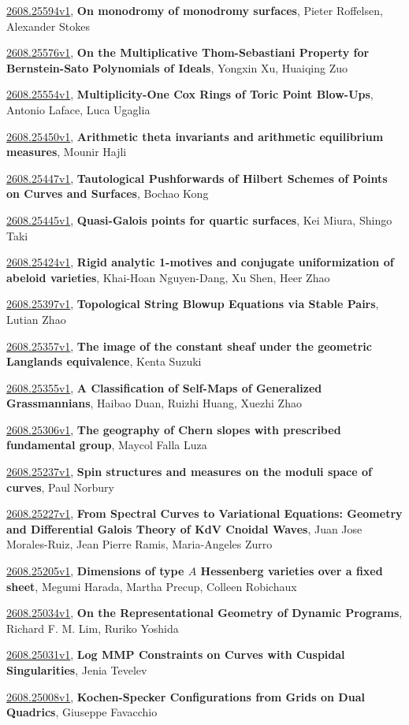 \documentclass[9pt, a4paper]{article}
\theoremstyle{plain}
\theoremstyle{definition}
\theoremstyle{remark}
\newcommand{\arxiv}[3]{\href{https://arxiv.org/abs/#1}{#1}, \textbf{\textcolor{arxivblue}{#2}}, #3}
\begin{document}
\arxiv{2608.25594v1}{On monodromy of monodromy surfaces}{Pieter Roffelsen, Alexander Stokes}

\arxiv{2608.25576v1}{On the Multiplicative Thom-Sebastiani Property for Bernstein-Sato Polynomials of Ideals}{Yongxin Xu, Huaiqing Zuo}

\arxiv{2608.25554v1}{Multiplicity-One Cox Rings of Toric Point Blow-Ups}{Antonio Laface, Luca Ugaglia}

\arxiv{2608.25450v1}{Arithmetic theta invariants and arithmetic equilibrium measures}{Mounir Hajli}

\arxiv{2608.25447v1}{Tautological Pushforwards of Hilbert Schemes of Points on Curves and Surfaces}{Bochao Kong}

\arxiv{2608.25445v1}{Quasi-Galois points for quartic surfaces}{Kei Miura, Shingo Taki}

\arxiv{2608.25424v1}{Rigid analytic 1-motives and conjugate uniformization of abeloid varieties}{Khai-Hoan Nguyen-Dang, Xu Shen, Heer Zhao}

\arxiv{2608.25397v1}{Topological String Blowup Equations via Stable Pairs}{Lutian Zhao}

\arxiv{2608.25357v1}{The image of the constant sheaf under the geometric Langlands equivalence}{Kenta Suzuki}

\arxiv{2608.25355v1}{A Classification of Self-Maps of Generalized Grassmannians}{Haibao Duan, Ruizhi Huang, Xuezhi Zhao}

\arxiv{2608.25306v1}{The geography of Chern slopes with prescribed fundamental group}{Maycol Falla Luza}

\arxiv{2608.25237v1}{Spin structures and measures on the moduli space of curves}{Paul Norbury}

\arxiv{2608.25227v1}{From Spectral Curves to Variational Equations: Geometry and Differential Galois Theory of KdV Cnoidal Waves}{Juan Jose Morales-Ruiz, Jean Pierre Ramis, Maria-Angeles Zurro}

\arxiv{2608.25205v1}{Dimensions of type $A$ Hessenberg varieties over a fixed sheet}{Megumi Harada, Martha Precup, Colleen Robichaux}

\arxiv{2608.25034v1}{On the Representational Geometry of Dynamic Programs}{Richard F. M. Lim, Ruriko Yoshida}

\arxiv{2608.25031v1}{Log MMP Constraints on Curves with Cuspidal Singularities}{Jenia Tevelev}

\arxiv{2608.25008v1}{Kochen-Specker Configurations from Grids on Dual Quadrics}{Giuseppe Favacchio}
\end{document}
